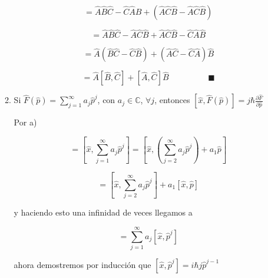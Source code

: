 \documentclass[12pt,a4paper]{article}
\begin{document}
\begin{enumerate}
\begin{enumerate}
        \begin{equation*}
            = \hat{A}\hat{B} \hat{C} - \hat{C}\hat{A}\hat{B} + (\hat{A}\hat{C}\hat{B} - \hat{A}\hat{C}\hat{B})
        \end{equation*}
        
        \begin{equation*}
            = \hat{A}\hat{B} \hat{C}- \hat{A}\hat{C}\hat{B}+ \hat{A}\hat{C}\hat{B} - \hat{C}\hat{A}\hat{B}  
        \end{equation*}
        
        \begin{equation*}
            =\hat{A}(\hat{B} \hat{C}-\hat{C}\hat{B})+ (\hat{A}\hat{C} - \hat{C}\hat{A})\hat{B}  
        \end{equation*}
        
        \begin{equation*}
            = \hat{A}[\hat{B},\hat{C}] + [\hat{A}, \hat{C}]\hat{B} \hspace{2cm} \blacksquare
        \end{equation*}
        
        \item Si $\hat{F}(\hat{p}) = \sum_{j=1}^{\infty} a_j \hat{p}^j$, con $a_j \in \mathbb{C}$, $\forall j$, entonces $[\hat{x},\hat{F}(\hat{p})]= j \hbar \frac{\partial \hat{F}}{\partial \hat{p}}$
        
        Por a) 
        
        \begin{equation*}
            [\hat{x}, \hat{F}(\hat{p})] = [\hat{x},\sum_{j=1}^{\infty} a_j \hat{p}^j ] = [\hat{x},(\sum_{j=2}^{\infty} a_j \hat{p}^j) + a_1 \hat{p} ]
        \end{equation*}
        
        \begin{equation*}
            =[\hat{x},\sum_{j=2}^{\infty} a_j \hat{p}^j] + a_1[\hat{x}, \hat{p}]
        \end{equation*}
        
        y haciendo esto una infinidad de veces llegamos a
        
        \begin{equation*}
            [\hat{x}, \hat{F}(\hat{p})] = \sum_{j=1}^{\infty} a_j [\hat{x}, \hat{p}^j]
        \end{equation*}
        
        ahora demostremos por inducción que $[\hat{x}, \hat{p}^j] = i \hbar j \hat{p}^{j-1} $
        

\end{enumerate}
\end{enumerate}
\end{document}
